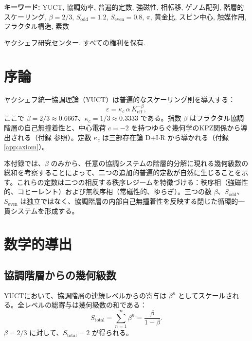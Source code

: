 \documentclass[11pt,a4paper]{article}
\begin{document}
\begin{titlepage}
\begin{center}
			\vspace{0.5cm}
			\noindent
			\footnotesize\textbf{キーワード:} YUCT, 協調効率, 普遍的定数, 強磁性, 相転移, ゲノム配列, 階層的スケーリング, \(\beta = 2/3\), \(S_{\text{odd}} = 1.2\), \(S_{\text{even}} = 0.8\), \(\pi\), 黄金比, スピン中心, 触媒作用, フラクタル構造, 素数
			
			\vspace{0.3cm}
			\noindent
			\footnotesize{} ヤクシェフ研究センター. すべての権利を保有.
		\end{center}
	\end{titlepage}
	
	\tableofcontents
	\newpage
	
	\section{序論}
	ヤクシェフ統一協調理論（YUCT）は普遍的なスケーリング則を導入する：
	\[
	\varepsilon = \kappa_c \, \alpha \, K_{\mathrm{eff}}^{-\beta},
	\]
	ここで \(\beta = 2/3 \approx 0.6667\)、\(\kappa_c = 1/3 \approx 0.3333\) である。指数 \(\beta\) はフラクタル協調階層の自己無撞着性と、中心電荷 \(c = -2\) を持つゆらぐ幾何学のKPZ関係から導出される（付録 \cite{AppendixL, AppendixY} 参照）。定数 \(\kappa_c\) は三部存在論 D+I\(\cdot\)R から導かれる（付録 \ref{app:axiom}）。
	
	本付録では、\(\beta\) のみから、任意の協調システムの階層的分解に現れる幾何級数の総和を考察することによって、二つの追加的普遍的定数が自然に生じることを示す。これらの定数は二つの相反する秩序レジームを特徴づける：秩序相（強磁性的、コヒーレント）および無秩序相（常磁性的、ゆらぎ）。三つの数 \(\beta\)、\(S_{\text{odd}}\)、\(S_{\text{even}}\) は独立ではなく、協調階層の内部自己無撞着性を反映する閉じた循環的一貫システムを形成する。
	
	\section{数学的導出}
	
	\subsection{協調階層からの幾何級数}
	YUCTにおいて、協調階層の連続レベルからの寄与は \(\beta^n\) としてスケールされる。全レベルの総寄与は幾何級数の和である：
	\[
	S_{\text{total}} = \sum_{n=1}^{\infty} \beta^n = \frac{\beta}{1-\beta}.
	\]
	\(\beta = 2/3\) に対して、\(S_{\text{total}} = 2\) が得られる。
	
\end{document}
